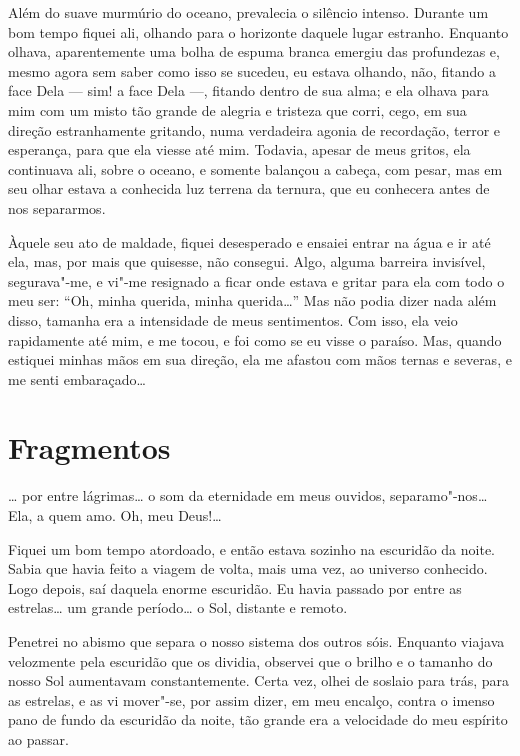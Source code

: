 Além do suave murmúrio do oceano, prevalecia o silêncio intenso. Durante um bom tempo fiquei ali, olhando para o
horizonte daquele lugar estranho. Enquanto olhava, aparentemente uma bolha de espuma branca emergiu das profundezas e,
mesmo agora sem saber como isso se sucedeu, eu estava olhando, não, fitando a face Dela --- sim! a face Dela ---, fitando
dentro de sua alma; e ela olhava para mim com um misto tão grande de alegria e tristeza que corri, cego, em sua
direção estranhamente gritando, numa verdadeira agonia de recordação, terror e esperança, para que ela viesse até mim.
Todavia, apesar de meus gritos, ela continuava ali, sobre o oceano, e somente balançou a cabeça, com pesar, mas em seu
olhar estava a conhecida luz terrena da ternura, que eu conhecera antes de nos separarmos.

Àquele seu ato de maldade, fiquei desesperado e ensaiei entrar na água e ir até ela, mas, por mais que quisesse, não
consegui. Algo, alguma barreira invisível, segurava"-me, e vi"-me resignado a ficar onde estava e gritar para ela com
todo o meu ser: ``Oh, minha querida, minha querida\ldots{}'' Mas não podia dizer nada além disso, tamanha era a intensidade
de meus sentimentos. Com isso, ela veio rapidamente até mim, e me tocou, e foi como se eu visse o paraíso. Mas,
quando estiquei minhas mãos em sua direção, ela me afastou com mãos ternas e severas, e me senti
embaraçado\ldots{}

\section{Fragmentos}

\ldots{} por entre lágrimas\ldots{} o som da eternidade em meus ouvidos, separamo"-nos\ldots{} Ela, a quem amo. Oh, meu
Deus!\ldots{}

Fiquei um bom tempo atordoado, e então estava sozinho na escuridão da noite. Sabia que havia feito a viagem de volta,
mais uma vez, ao universo conhecido. Logo depois, saí daquela enorme escuridão. Eu havia passado por entre as
estrelas\ldots{} um grande período\ldots{} o Sol, distante e remoto.

Penetrei no abismo que separa o nosso sistema dos outros sóis. Enquanto viajava velozmente pela escuridão que os
dividia, observei que o brilho e o tamanho do nosso Sol aumentavam constantemente. Certa vez, olhei de soslaio para
trás, para as estrelas, e as vi mover"-se, por assim dizer, em meu encalço, contra o imenso pano de fundo da escuridão
da noite, tão grande era a velocidade do meu espírito ao passar.

